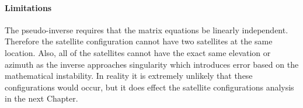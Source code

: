 \paragraph{Limitations}
The pseudo-inverse requires that the matrix equations be linearly independent. Therefore the satellite configuration cannot have two satellites at the same location. Also, all of the satellites cannot have the exact same elevation or azimuth as the inverse approaches singularity which introduces error based on the mathematical instability. In reality it is extremely unlikely that these configurations would occur, but it does effect the satellite configurations analysis in the next Chapter.



